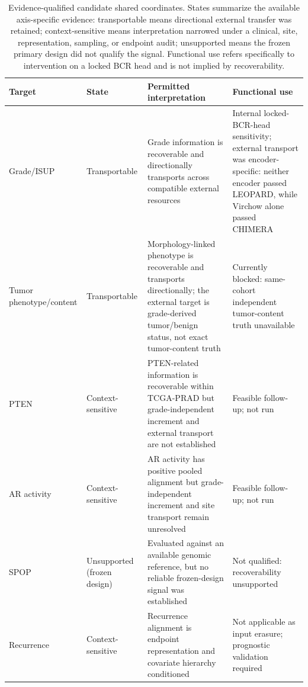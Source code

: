 \begin{table}[H]
\centering
\footnotesize
\setlength{\tabcolsep}{3pt}
\renewcommand{\arraystretch}{1.18}
\caption{Evidence-qualified candidate shared coordinates. States summarize the available axis-specific evidence: transportable means directional external transfer was retained; context-sensitive means interpretation narrowed under a clinical, site, representation, sampling, or endpoint audit; unsupported means the frozen primary design did not qualify the signal. Functional use refers specifically to intervention on a locked BCR head and is not implied by recoverability.}
\label{tab:alignment-summary}
\begin{tabular}{@{}>{\raggedright\arraybackslash}p{}>{\raggedright\arraybackslash}p{}>{\raggedright\arraybackslash}p{}>{\raggedright\arraybackslash}p{}@{}}
\toprule
Target & State & Permitted interpretation & Functional use \\
\midrule
Grade/ISUP & Transportable & Grade information is recoverable and directionally transports across compatible external resources & Internal locked-BCR-head sensitivity; external transport was encoder-specific: neither encoder passed LEOPARD, while Virchow alone passed CHIMERA \\
Tumor phenotype/content & Transportable & Morphology-linked phenotype is recoverable and transports directionally; the external target is grade-derived tumor/benign status, not exact tumor-content truth & Currently blocked: same-cohort independent tumor-content truth unavailable \\
PTEN & Context-sensitive & PTEN-related information is recoverable within TCGA-PRAD but grade-independent increment and external transport are not established & Feasible follow-up; not run \\
AR activity & Context-sensitive & AR activity has positive pooled alignment but grade-independent increment and site transport remain unresolved & Feasible follow-up; not run \\
SPOP & Unsupported (frozen design) & Evaluated against an available genomic reference, but no reliable frozen-design signal was established & Not qualified: recoverability unsupported \\
Recurrence & Context-sensitive & Recurrence alignment is endpoint representation and covariate hierarchy conditioned & Not applicable as input erasure; prognostic validation required \\
\bottomrule
\end{tabular}
\end{table}
